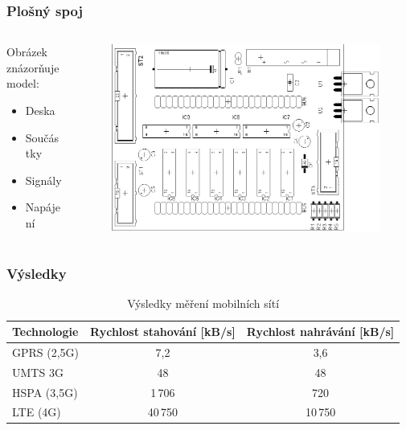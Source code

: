 \documentclass[%
  12pt,       				%
	t,                  %
	aspectratio=1610,   %
	unicode,						%
czech,              %
]{beamer}				    	%
\begin{document}
\begin{frame} 
	\frametitle{Plošný spoj}
	
	\begin{columns}[T] 								%
		\begin{column}{0.4\textwidth}		%
			Obrázek znázorňuje model:\\[2ex]
			\begin{itemize}
				\item Deska
				\item Součástky
				\item Signály
				\item Napájení
			\end{itemize}
		\end{column}
		\begin{column}{0.6\textwidth}		%
			\begin{figure}%
				\centering
				\vspace{1cm}	              %
				\includegraphics[width=0.8\columnwidth]{obrazky/soucastky}
			\end{figure}
		\end{column}
	\end{columns}											%
\end{frame}


\begin{frame} 
	\frametitle{Výsledky}
	\vspace{1cm}
	\begin{table}[]
		\centering
		\caption{Výsledky měření mobilních sítí}
		\label{tab:tabulka}
			\begin{tabular}{lcc}
				\toprule
					Technologie  & Rychlost stahování [kB/s] & Rychlost nahrávání [kB/s] \\
				\midrule
					GPRS (2,5G)	& 7,2 	& 3,6\\
					UMTS 3G     & 48 		& 48\\
					HSPA (3,5G)	&	1\,706	&	720\\
					LTE (4G) 		& 40\,750 & 10\,750\\
				\bottomrule                                       
			\end{tabular}
	\end{table}
\end{frame}
\end{document}
